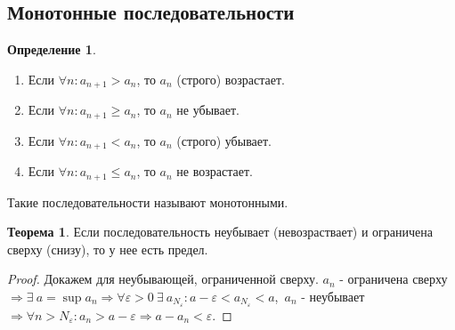 \documentclass[a4paper, 12pt]{article}
\renewcommand{\epsilon}{\varepsilon}
\newcommand\tab[1][.5cm]{\hspace*{#1}}
\theoremstyle{definition}
\newtheorem*{definition}{Определение}
\newtheorem*{theorem}{Теорема}
\begin{document}
        \subsection{Монотонные последовательности}
        \begin{definition} \tab
            \begin{enumerate}
                \item Если $\forall n: a_{n+1}>a_n$, то $a_n$ (строго) возрастает.
                \item Если $\forall n: a_{n+1}\geq a_n$, то $a_n$ не убывает.
                \item Если $\forall n: a_{n+1}<a_n$, то $a_n$ (строго) убывает.
                \item Если $\forall n: a_{n+1}\leq a_n$, то $a_n$ не возрастает.
            \end{enumerate}
            Такие последовательности называют монотонными.
        \end{definition} 
        \begin{theorem}
            Если последовательность неубывает (невозраствает) и ограничена сверху (снизу), то у нее есть предел.
        \end{theorem}
        \begin{proof}
            Докажем для неубывающей, ограниченной сверху. $a_n$ - ограничена сверху $\Rightarrow \exists\ a=\sup a_n \Rightarrow \forall \epsilon>0\ \exists\ a_{N_{\epsilon}}: a-\epsilon<a_{N_{\epsilon}}<a$,\ $a_n$ - неубывает $\Rightarrow \forall n>N_{\epsilon}: a_n>a-\epsilon \Rightarrow a-a_n<\epsilon$.
        \end{proof}
\end{document}

